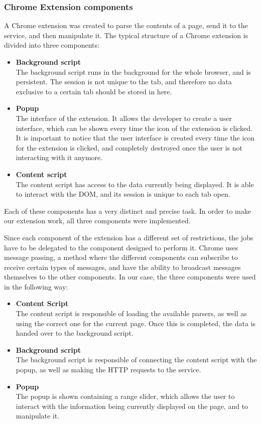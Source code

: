 \subsubsection{Chrome Extension components}
A Chrome extension was created to parse the contents of a page, send it to the service, and then manipulate it. The  typical structure of a Chrome extension is divided into three components:
\begin{itemize}
\item \textbf{Background script}\\
The background script runs in the background for the whole browser, and is persistent. The session is not unique to the tab, and therefore no data exclusive to a certain tab should be stored in here.
\item \textbf{Popup}\\
The interface of the extension. It allows the developer to create a user interface, which can be shown every time the icon of the extension is clicked. It is important to notice that the user interface is created every time the icon for the extension is clicked, and completely destroyed once the user is not interacting with it anymore. 
\item \textbf{Content script}\\
The content script has access to the data currently being displayed. It is able to interact with the DOM, and its session is unique to each tab open. 
\end{itemize}
Each of these components has a very distinct and precise task. In order to make our extension work, all three components were implemented. 

Since each component of the extension has a different set of restrictions, the jobs have to be delegated to the component designed to perform it. Chrome uses message passing, a method where the different components can subscribe to receive certain types of messages, and have the ability to broadcast messages themselves to the other components. In our case, the three components were used in the following way:
\begin{itemize}
\item \textbf{Content Script}\\
The content script is responsible of loading the available parsers, as well as using the correct one for the current page. Once this is completed, the data is handed over to the background script.
\item \textbf{Background script}\\
The background script is responsible of connecting the content script with the popup, as well as making the HTTP requests to the service. 
\item \textbf{Popup}\\
The popup is shown containing a range slider, which allows the user to interact with the information being currently displayed on the page, and to manipulate it. 
\end{itemize}


